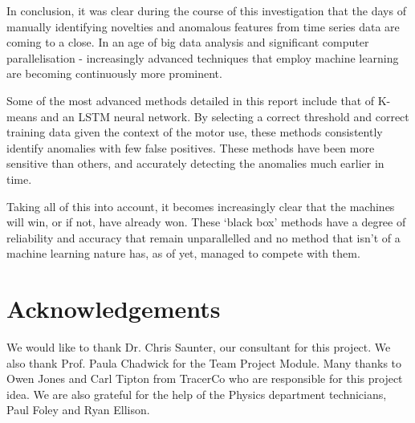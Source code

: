 % 
In conclusion, it was clear during the course of this investigation that the days of manually identifying novelties and anomalous features from time series data are coming to a close. In an age of big data analysis and significant computer parallelisation - increasingly advanced techniques that employ machine learning are becoming continuously more prominent. 

Some of the most advanced methods detailed in this report include that of K-means and an LSTM neural network. By selecting a correct threshold and correct training data given the context of the motor use, these methods consistently identify anomalies with few false positives. These methods have been more sensitive than others, and accurately detecting the anomalies much earlier in time.

Taking all of this into account, it becomes increasingly clear that the machines will win, or if not, have already won. These `black box' methods have a degree of reliability and accuracy that remain unparallelled and no method that isn't of a machine learning nature has, as of yet, managed to compete with them.


\section*{Acknowledgements}

\small We would like to thank Dr. Chris Saunter, our consultant for this project. We also thank Prof. Paula Chadwick for the Team Project Module. Many thanks to Owen Jones and Carl Tipton from TracerCo who are responsible for this project idea. We are also grateful for the help of the Physics department technicians, Paul Foley and Ryan Ellison.




















































